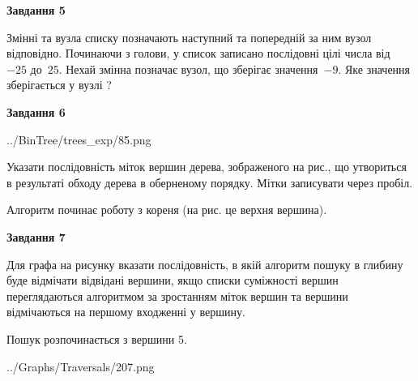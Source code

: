 \documentclass[12pt, ukrainian]{article}
\begin{document}
{\begin {large}
{\begin {center}\textbf{Завдання 5}\end {center}}\par
Змінні  та  вузла списку позначають наступний та попередній за ним вузол відповідно. Починаючи з голови, у список записано послідовні цілі числа від~$-25$ до~$25$. Нехай змінна  позначає вузол, що зберігає значення~$-9$.
Яке значення зберігається у вузлі  ?\par
\newpage

{\begin {center}\textbf{Завдання 6}\end {center}}\par

\begin{center}
	{../BinTree/trees_exp/85.png}
\end{center}
Указати послідовність міток вершин дерева, зображеного на рис., що утвориться в результаті обходу дерева в оберненому порядку. Мітки записувати через пробіл.\par Алгоритм починає роботу з кореня (на рис. це верхня вершина).\par
\newpage

{\begin {center}\textbf{Завдання 7}\end {center}}\par
Для графа на рисунку вказати послідовність, в якій алгоритм пошуку в глибину буде відмічати відвідані вершини, якщо списки суміжності вершин переглядаються алгоритмом за зростанням міток вершин та вершини відмічаються на першому вход\-женні у вершину.\par
Пошук розпочинається з вершини 5.\par

\begin{center}
	{../Graphs/Traversals/207.png}
\end{center}\par
\newpage


\end{large}}
\end{document}
